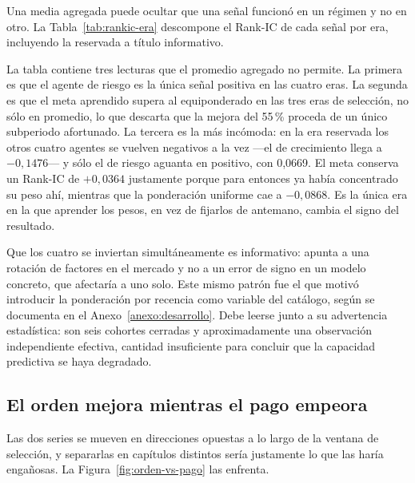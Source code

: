 Una media agregada puede ocultar que una señal funcionó en un régimen y no en otro. La
Tabla~\ref{tab:rankic-era} descompone el Rank-IC de cada señal por era, incluyendo la reservada a
título informativo.

\begin{table}[htbp]
  \centering
  \small
  \caption{Rank-IC medio por señal y era.}
  \label{tab:rankic-era}
  
  \caption*{Las tres primeras columnas son ventana de selección; la cuarta es la era reservada y no
  intervino en ninguna decisión.}
\end{table}


La tabla contiene tres lecturas que el promedio agregado no permite. La primera es que el agente de
riesgo es la única señal positiva en las cuatro eras. La segunda es que el meta aprendido supera al
equiponderado en las tres eras de selección, no sólo en promedio, lo que descarta que la mejora del
55\,\% proceda de un único subperiodo afortunado. La tercera es la más incómoda: en la era reservada
los otros cuatro agentes se vuelven negativos a la vez ---el de crecimiento llega a $-0{,}1476$--- y
sólo el de riesgo aguanta en positivo, con 0,0669. El meta conserva un Rank-IC de $+0{,}0364$
justamente porque para entonces ya había concentrado su peso ahí, mientras que la ponderación
uniforme cae a $-0{,}0868$. Es la única era en la que aprender los pesos, en vez de fijarlos de
antemano, cambia el signo del resultado.

Que los cuatro se inviertan simultáneamente es informativo: apunta a una rotación de factores
en el mercado y no a un error de signo en un modelo concreto, que afectaría a uno solo. Este mismo
patrón fue el que motivó introducir la ponderación por recencia como variable del catálogo, según se
documenta en el Anexo~\ref{anexo:desarrollo}. Debe leerse junto a su advertencia estadística: son
seis cohortes cerradas y aproximadamente una observación independiente efectiva, cantidad
insuficiente para concluir que la capacidad predictiva se haya degradado.

\subsection{El orden mejora mientras el pago empeora}

Las dos series se mueven en direcciones opuestas a lo largo de la ventana de selección, y separarlas
en capítulos distintos sería justamente lo que las haría engañosas. La
Figura~\ref{fig:orden-vs-pago} las enfrenta.

